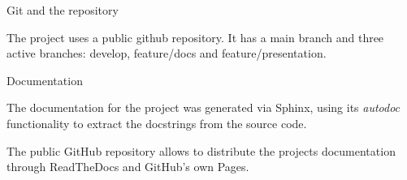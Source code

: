\documentclass{beamer}
\begin{document}

\begin{frame}{Git and the repository}

The project uses a public github repository. It has a main branch and three active branches: develop, feature/docs and feature/presentation.


\end{frame}


\begin{frame}{Documentation}

The documentation for the project was generated via Sphinx, using its \emph{autodoc} functionality to extract the docstrings from the source code.

The public GitHub repository allows to distribute the projects documentation through ReadTheDocs and GitHub's own Pages.


\end{frame}
\end{document}
